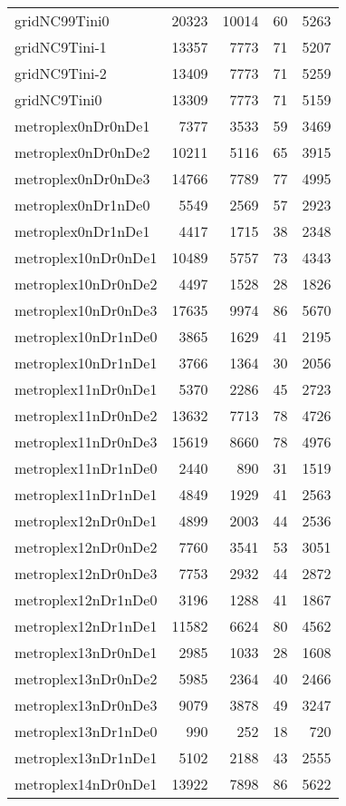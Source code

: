 \begin{longtable}{lrrrr}
gridNC99Tini0 & 20323 & 10014 & 60 & 5263 \\
gridNC9Tini-1 & 13357 & 7773 & 71 & 5207 \\
gridNC9Tini-2 & 13409 & 7773 & 71 & 5259 \\
gridNC9Tini0 & 13309 & 7773 & 71 & 5159 \\
metroplex0nDr0nDe1 & 7377 & 3533 & 59 & 3469 \\
metroplex0nDr0nDe2 & 10211 & 5116 & 65 & 3915 \\
metroplex0nDr0nDe3 & 14766 & 7789 & 77 & 4995 \\
metroplex0nDr1nDe0 & 5549 & 2569 & 57 & 2923 \\
metroplex0nDr1nDe1 & 4417 & 1715 & 38 & 2348 \\
metroplex10nDr0nDe1 & 10489 & 5757 & 73 & 4343 \\
metroplex10nDr0nDe2 & 4497 & 1528 & 28 & 1826 \\
metroplex10nDr0nDe3 & 17635 & 9974 & 86 & 5670 \\
metroplex10nDr1nDe0 & 3865 & 1629 & 41 & 2195 \\
metroplex10nDr1nDe1 & 3766 & 1364 & 30 & 2056 \\
metroplex11nDr0nDe1 & 5370 & 2286 & 45 & 2723 \\
metroplex11nDr0nDe2 & 13632 & 7713 & 78 & 4726 \\
metroplex11nDr0nDe3 & 15619 & 8660 & 78 & 4976 \\
metroplex11nDr1nDe0 & 2440 & 890 & 31 & 1519 \\
metroplex11nDr1nDe1 & 4849 & 1929 & 41 & 2563 \\
metroplex12nDr0nDe1 & 4899 & 2003 & 44 & 2536 \\
metroplex12nDr0nDe2 & 7760 & 3541 & 53 & 3051 \\
metroplex12nDr0nDe3 & 7753 & 2932 & 44 & 2872 \\
metroplex12nDr1nDe0 & 3196 & 1288 & 41 & 1867 \\
metroplex12nDr1nDe1 & 11582 & 6624 & 80 & 4562 \\
metroplex13nDr0nDe1 & 2985 & 1033 & 28 & 1608 \\
metroplex13nDr0nDe2 & 5985 & 2364 & 40 & 2466 \\
metroplex13nDr0nDe3 & 9079 & 3878 & 49 & 3247 \\
metroplex13nDr1nDe0 & 990 & 252 & 18 & 720 \\
metroplex13nDr1nDe1 & 5102 & 2188 & 43 & 2555 \\
metroplex14nDr0nDe1 & 13922 & 7898 & 86 & 5622 \\

\end{longtable}
